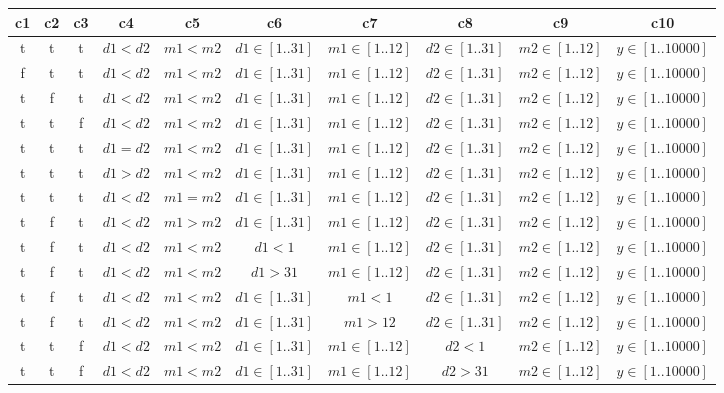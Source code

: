 \documentclass[12pt,a4paper]{article}
\begin{document}
\begin{tabular}{|c|c|c|c|c|c|c|c|c|c|}
\hline
c1 & c2 & c3 & c4 & c5 & c6 & c7 & c8 & c9 & c10 \\
\hline
t & t & t & $d1 < d2$ & $m1 < m2$ & $d1 \in [1..31]$ & $m1 \in [1..12]$ & $d2 \in [1..31]$ & $m2 \in [1..12]$ & $y \in [1..10000]$ \\
\hline
f & t & t & $d1 < d2$ & $m1 < m2$ & $d1 \in [1..31]$ & $m1 \in [1..12]$ & $d2 \in [1..31]$ & $m2 \in [1..12]$ & $y \in [1..10000]$ \\
\hline
t & f & t & $d1 < d2$ & $m1 < m2$ & $d1 \in [1..31]$ & $m1 \in [1..12]$ & $d2 \in [1..31]$ & $m2 \in [1..12]$ & $y \in [1..10000]$ \\
\hline
t & t & f & $d1 < d2$ & $m1 < m2$ & $d1 \in [1..31]$ & $m1 \in [1..12]$ & $d2 \in [1..31]$ & $m2 \in [1..12]$ & $y \in [1..10000]$ \\
\hline
t & t & t & $d1 = d2$ & $m1 < m2$ & $d1 \in [1..31]$ & $m1 \in [1..12]$ & $d2 \in [1..31]$ & $m2 \in [1..12]$ & $y \in [1..10000]$ \\
\hline
t & t & t & $d1 > d2$ & $m1 < m2$ & $d1 \in [1..31]$ & $m1 \in [1..12]$ & $d2 \in [1..31]$ & $m2 \in [1..12]$ & $y \in [1..10000]$ \\
\hline
t & t & t & $d1 < d2$ & $m1 = m2$ & $d1 \in [1..31]$ & $m1 \in [1..12]$ & $d2 \in [1..31]$ & $m2 \in [1..12]$ & $y \in [1..10000]$ \\
\hline
t & f & t & $d1 < d2$ & $m1 > m2$ & $d1 \in [1..31]$ & $m1 \in [1..12]$ & $d2 \in [1..31]$ & $m2 \in [1..12]$ & $y \in [1..10000]$ \\
\hline
t & f & t & $d1 < d2$ & $m1 < m2$ & $d1 < 1$ & $m1 \in [1..12]$ & $d2 \in [1..31]$ & $m2 \in [1..12]$ & $y \in [1..10000]$ \\
\hline
t & f & t & $d1 < d2$ & $m1 < m2$ & $d1 > 31$ & $m1 \in [1..12]$ & $d2 \in [1..31]$ & $m2 \in [1..12]$ & $y \in [1..10000]$ \\
\hline
t & f & t & $d1 < d2$ & $m1 < m2$ & $d1 \in [1..31]$ & $m1 < 1$ & $d2 \in [1..31]$ & $m2 \in [1..12]$ & $y \in [1..10000]$ \\
\hline
t & f & t & $d1 < d2$ & $m1 < m2$ & $d1 \in [1..31]$ & $m1 > 12$ & $d2 \in [1..31]$ & $m2 \in [1..12]$ & $y \in [1..10000]$ \\
\hline
t & t & f & $d1 < d2$ & $m1 < m2$ & $d1 \in [1..31]$ & $m1 \in [1..12]$ & $d2 < 1$ & $m2 \in [1..12]$ & $y \in [1..10000]$ \\
\hline
t & t & f & $d1 < d2$ & $m1 < m2$ & $d1 \in [1..31]$ & $m1 \in [1..12]$ & $d2 > 31$ & $m2 \in [1..12]$ & $y \in [1..10000]$ \\

\end{tabular}
\end{document}
